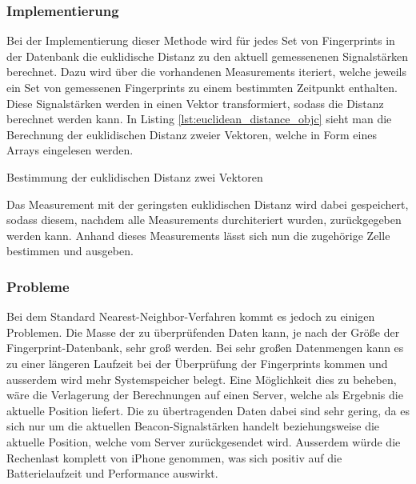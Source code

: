 \subsubsection{Implementierung}
\label{sec:implementation:fingerprinting:positioning:naiv:implementation}
Bei der Implementierung dieser Methode wird für jedes Set von Fingerprints in der Datenbank die euklidische Distanz zu den aktuell gemessenenen Signalstärken berechnet. Dazu wird über die vorhandenen Measurements iteriert, welche jeweils ein Set von gemessenen Fingerprints zu einem bestimmten Zeitpunkt enthalten. Diese Signalstärken werden in einen Vektor transformiert, sodass die Distanz berechnet werden kann. In Listing \ref{lst:euclidean_distance_objc} sieht man die Berechnung der euklidischen Distanz zweier Vektoren, welche in Form eines Arrays eingelesen werden.

\begin{listing}[htb!]
    \caption{Bestimmung der euklidischen Distanz zwei Vektoren}
	\label{lst:euclidean_distance_objc}
\end{listing}

Das Measurement mit der geringsten euklidischen Distanz wird dabei gespeichert, sodass diesem, nachdem alle Measurements durchiteriert wurden, zurückgegeben werden kann. Anhand dieses Measurements lässt sich nun die zugehörige Zelle bestimmen und ausgeben.

\subsubsection{Probleme}
\label{sec:implementation:fingerprinting:positioning:naiv:problems}
Bei dem Standard Nearest-Neighbor-Verfahren kommt es jedoch zu einigen Problemen. 
Die Masse der zu überprüfenden Daten kann, je nach der Größe der Fingerprint-Datenbank, sehr groß werden. Bei sehr großen Datenmengen kann es zu einer längeren Laufzeit bei der Überprüfung der Fingerprints kommen und ausserdem wird mehr Systemspeicher belegt. 
Eine Möglichkeit dies zu beheben, wäre die Verlagerung der Berechnungen auf einen Server, welche als Ergebnis die aktuelle Position liefert. Die zu übertragenden Daten dabei sind sehr gering, da es sich nur um die aktuellen Beacon-Signalstärken handelt beziehungsweise die aktuelle Position, welche vom Server zurückgesendet wird. 
Ausserdem würde die Rechenlast komplett von iPhone genommen, was sich positiv auf die Batterielaufzeit und Performance auswirkt.

